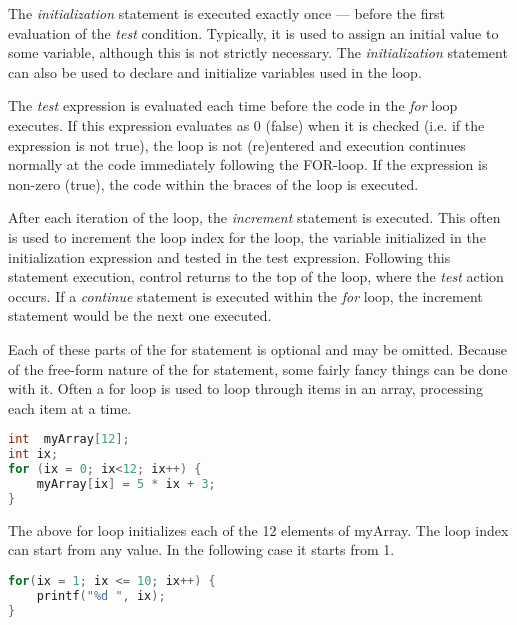 The \emph{initialization} statement is executed exactly once --- before the
first evaluation of the \emph{test} condition. Typically, it is used to assign
an initial value to some variable, although this is not strictly necessary. The
\emph{initialization} statement can also be used to declare and initialize
variables used in the loop.

The \emph{test} expression is evaluated each time before the code in the
\emph{for} loop executes. If this expression evaluates as 0 (false) when it is
checked (i.e. if the expression is not true), the loop is not (re)entered and
execution continues normally at the code immediately following the FOR-loop. If
the expression is non-zero (true), the code within the braces of the loop is
executed. 

After each iteration of the loop, the \emph{increment} statement is executed.
This often is used to increment the loop index for the loop, the variable
initialized in the initialization expression and tested in the test expression.
Following this statement execution, control returns to the top of the loop,
where the \emph{test} action occurs. If a \emph{continue} statement is executed
within the \emph{for} loop, the increment statement would be the next one
executed. 

Each of these parts of the for statement is optional and may be omitted.
Because of the free-form nature of the for statement, some fairly fancy things
can be done with it. Often a for loop is used to loop through items in an
array, processing each item at a time. 
\lstset{basicstyle=\scriptsize, numbers=left, captionpos=b, tabsize=4}
\begin{lstlisting}[caption=Section \thesection listing \arabic{controlcnt},language={C},
breaklines=true,xleftmargin=15pt, label=lst:section\thesection listing\arabic{controlcnt}]
int  myArray[12];
int ix;
for (ix = 0; ix<12; ix++) {
	myArray[ix] = 5 * ix + 3;
}
\end{lstlisting}

The above for loop initializes each of the 12 elements of myArray.  The loop
index can start from any value. In the following case it starts from 1.
\lstset{basicstyle=\scriptsize, numbers=left, captionpos=b, tabsize=4}
\begin{lstlisting}[caption=Section \thesection listing \arabic{controlcnt},language={C},
breaklines=true,xleftmargin=15pt, label=lst:section\thesection listing\arabic{controlcnt}]
for(ix = 1; ix <= 10; ix++) {
	printf("%d ", ix);
}
\end{lstlisting}

